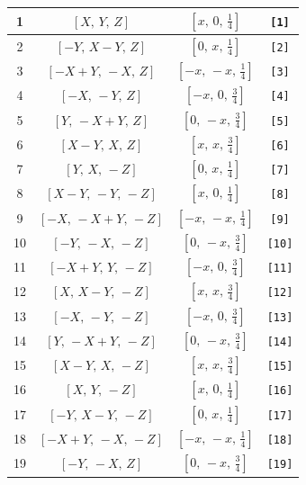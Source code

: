 \documentclass[fleqn,8pt]{jsarticle}
\begin{document}
\begin{longtable}{cccc}
1 & $\left[ X,\, Y,\, Z \right]$ & $\left[ x,\, 0,\, \frac{1}{4} \right]$ & {\tt [1]} \\ \hline
2 & $\left[ - Y,\, X - Y,\, Z \right]$ & $\left[ 0,\, x,\, \frac{1}{4} \right]$ & {\tt [2]} \\ \hline
3 & $\left[ - X + Y,\, - X,\, Z \right]$ & $\left[ - x,\, - x,\, \frac{1}{4} \right]$ & {\tt [3]} \\ \hline
4 & $\left[ - X,\, - Y,\, Z \right]$ & $\left[ - x,\, 0,\, \frac{3}{4} \right]$ & {\tt [4]} \\ \hline
5 & $\left[ Y,\, - X + Y,\, Z \right]$ & $\left[ 0,\, - x,\, \frac{3}{4} \right]$ & {\tt [5]} \\ \hline
6 & $\left[ X - Y,\, X,\, Z \right]$ & $\left[ x,\, x,\, \frac{3}{4} \right]$ & {\tt [6]} \\ \hline
7 & $\left[ Y,\, X,\, - Z \right]$ & $\left[ 0,\, x,\, \frac{1}{4} \right]$ & {\tt [7]} \\ \hline
8 & $\left[ X - Y,\, - Y,\, - Z \right]$ & $\left[ x,\, 0,\, \frac{1}{4} \right]$ & {\tt [8]} \\ \hline
9 & $\left[ - X,\, - X + Y,\, - Z \right]$ & $\left[ - x,\, - x,\, \frac{1}{4} \right]$ & {\tt [9]} \\ \hline
10 & $\left[ - Y,\, - X,\, - Z \right]$ & $\left[ 0,\, - x,\, \frac{3}{4} \right]$ & {\tt [10]} \\ \hline
11 & $\left[ - X + Y,\, Y,\, - Z \right]$ & $\left[ - x,\, 0,\, \frac{3}{4} \right]$ & {\tt [11]} \\ \hline
12 & $\left[ X,\, X - Y,\, - Z \right]$ & $\left[ x,\, x,\, \frac{3}{4} \right]$ & {\tt [12]} \\ \hline
13 & $\left[ - X,\, - Y,\, - Z \right]$ & $\left[ - x,\, 0,\, \frac{3}{4} \right]$ & {\tt [13]} \\ \hline
14 & $\left[ Y,\, - X + Y,\, - Z \right]$ & $\left[ 0,\, - x,\, \frac{3}{4} \right]$ & {\tt [14]} \\ \hline
15 & $\left[ X - Y,\, X,\, - Z \right]$ & $\left[ x,\, x,\, \frac{3}{4} \right]$ & {\tt [15]} \\ \hline
16 & $\left[ X,\, Y,\, - Z \right]$ & $\left[ x,\, 0,\, \frac{1}{4} \right]$ & {\tt [16]} \\ \hline
17 & $\left[ - Y,\, X - Y,\, - Z \right]$ & $\left[ 0,\, x,\, \frac{1}{4} \right]$ & {\tt [17]} \\ \hline
18 & $\left[ - X + Y,\, - X,\, - Z \right]$ & $\left[ - x,\, - x,\, \frac{1}{4} \right]$ & {\tt [18]} \\ \hline
19 & $\left[ - Y,\, - X,\, Z \right]$ & $\left[ 0,\, - x,\, \frac{3}{4} \right]$ & {\tt [19]} \\ \hline

\end{longtable}
\end{document}
